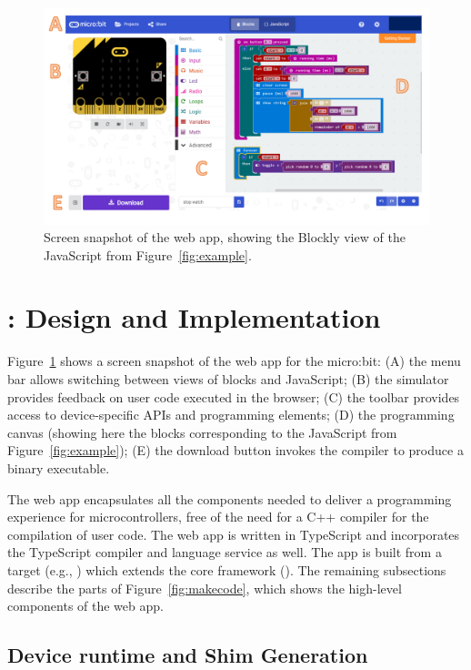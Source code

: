 
\begin{figure}[t]
    \includegraphics[width=5in]{screenSnapFig.pdf}
\caption{\label{fig:screenSnap}Screen snapshot of the \MC web app, showing the Blockly
view of the JavaScript from Figure~\ref{fig:example}.}
\end{figure}


\section{\MCN: Design and Implementation}
\label{sec:makecode}

Figure~\ref{fig:screenSnap} shows a screen snapshot of the \MC web app for the micro:bit: 
(A) the menu bar allows switching between views of blocks and JavaScript;
(B) the simulator provides feedback on user code executed in the browser;
(C) the toolbar provides access to device-specific APIs and programming elements;
(D) the programming canvas (showing here the blocks corresponding to the JavaScript from Figure~\ref{fig:example});
(E) the download button invokes the compiler to produce a binary executable.

The \MC web app encapsulates all the components needed to deliver a programming experience 
for microcontrollers, free of the need for a C++ compiler for the compilation of user code.
The web app is written in TypeScript and incorporates the TypeScript compiler and 
language service as well. 
The app is built from a target (e.g., \emph{})
which extends the core framework (\emph{}).
The remaining subsections describe the parts of Figure~\ref{fig:makecode}, 
which shows the high-level components of the web app.

\subsection{Device runtime and Shim Generation}


